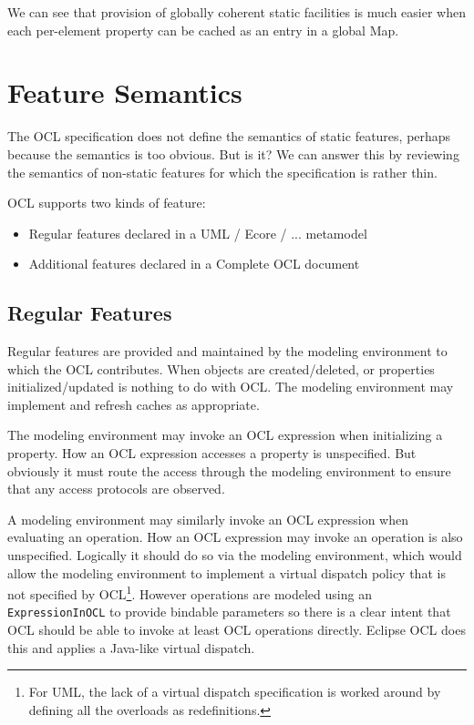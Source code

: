 \documentclass[sigconf]{acmart}
\begin{document}
We can see that provision of globally coherent static facilities is much easier when each per-element property can be cached as an entry in a global Map.

\section{Feature Semantics}\label{Static Semantics}

The OCL specification does not define the semantics of static features, perhaps because the semantics is too obvious. But is it? We can answer this by reviewing the semantics of non-static features for which the specification is rather thin.

OCL supports two kinds of feature:
\begin{itemize}
	\item Regular features declared in a UML / Ecore / ... metamodel
	\item Additional features declared in a Complete OCL document
\end{itemize}

\subsection{Regular Features}

Regular features are provided and maintained by the modeling environment to which the OCL contributes. When objects are created/deleted, or properties initialized/updated is nothing to do with OCL. The modeling environment may implement and refresh caches as appropriate.

The modeling environment may invoke an OCL expression when initializing a property. How an OCL expression accesses a property is unspecified. But obviously it must route the access through the modeling environment to ensure that any access protocols are observed.

A modeling environment may similarly invoke an OCL expression when evaluating an operation. How an OCL expression may invoke an operation is also unspecified. Logically it should do so via the modeling environment, which would allow the modeling environment to implement a virtual dispatch policy that is not specified by OCL\footnote{For UML, the lack of a virtual dispatch specification is worked around by defining all the overloads as redefinitions.}. However operations are modeled using an \verb|ExpressionInOCL| to provide bindable parameters so there is a clear intent that OCL should be able to invoke at least OCL operations directly. Eclipse OCL does this and applies a Java-like virtual dispatch.
\end{document}
